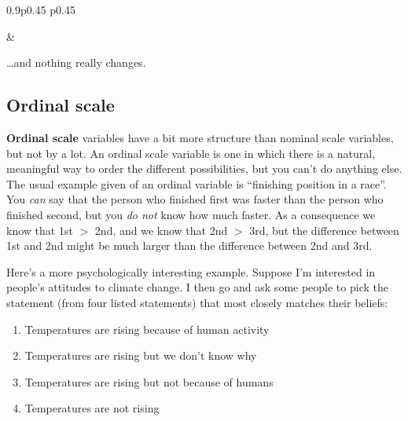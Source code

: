 \documentclass[
  a4paper,
]{book}
\providecommand{\tightlist}{%
  \setlength{\itemsep}{0pt}\setlength{\parskip}{0pt}}\usepackage{longtable,booktabs,array}
\begin{document}
\begin{table}[ht]
\begin{centerbox}
\begin{threeparttable}
\begin{tabularx}{0.9\textwidth}{p{} p{}}
\hhline{}

 &
 \tabularnewline[-0.5pt]


\end{tabularx} 

\end{threeparttable}\par\end{centerbox}

\end{table}
 

\ldots and nothing really changes.

\hypertarget{ordinal-scale}{%
\subsection{Ordinal scale}\label{ordinal-scale}}

\textbf{Ordinal scale} variables have a bit more structure than nominal
scale variables, but not by a lot. An ordinal scale variable is one in
which there is a natural, meaningful way to order the different
possibilities, but you can't do anything else. The usual example given
of an ordinal variable is ``finishing position in a race''. You
\emph{can} say that the person who finished first was faster than the
person who finished second, but you \emph{do not} know how much faster.
As a consequence we know that 1st \(>\) 2nd, and we know that 2nd \(>\)
3rd, but the difference between 1st and 2nd might be much larger than
the difference between 2nd and 3rd.

Here's a more psychologically interesting example. Suppose I'm
interested in people's attitudes to climate change. I then go and ask
some people to pick the statement (from four listed statements) that
most closely matches their beliefs:

\begin{enumerate}
\def\labelenumi{\arabic{enumi}.}
\tightlist
\item
  Temperatures are rising because of human activity
\item
  Temperatures are rising but we don't know why
\item
  Temperatures are rising but not because of humans
\item
  Temperatures are not rising
\end{enumerate}
\end{document}
